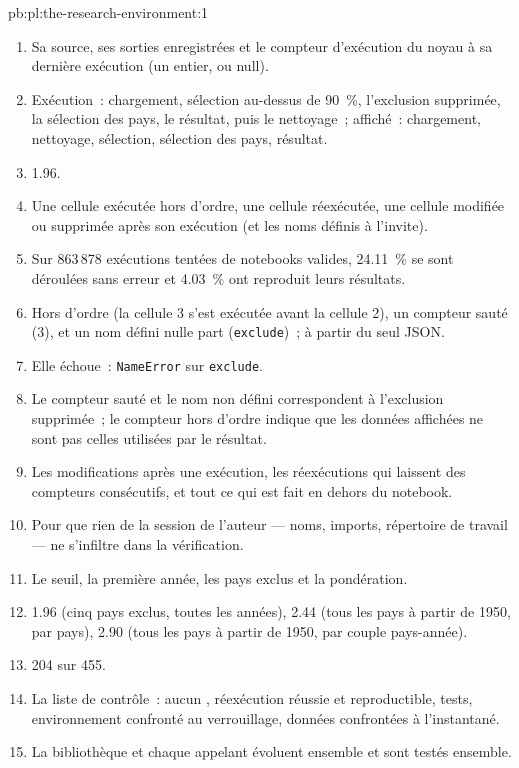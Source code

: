 \begin{solution}{pb:pl:the-research-environment:1}
\begin{enumerate}
\item Sa source, ses sorties enregistrées et le compteur d'exécution du noyau à sa dernière exécution (un entier, ou null).
\item Exécution~: chargement, sélection au-dessus de 90~\%, l'exclusion supprimée, la sélection des pays, le résultat, puis le nettoyage~; affiché~: chargement, nettoyage,
sélection, sélection des pays, résultat.
\item 1.96.
\item Une cellule exécutée hors d'ordre, une cellule réexécutée, une cellule modifiée ou supprimée après son exécution (et les noms définis à l'invite).
\item Sur 863\,878 exécutions tentées de notebooks valides, 24.11~\% se sont déroulées sans erreur et 4.03~\% ont reproduit leurs résultats.
\item Hors d'ordre (la cellule 3 s'est exécutée avant la cellule 2), un compteur sauté (3), et un nom défini nulle part (\texttt{exclude})~; à partir du seul JSON.
\item Elle échoue~: \texttt{NameError} sur \texttt{exclude}.
\item Le compteur sauté et le nom non défini correspondent à l'exclusion supprimée~; le compteur hors d'ordre indique que les données affichées ne sont pas celles utilisées par le
résultat.
\item Les modifications après une exécution, les réexécutions qui laissent des compteurs consécutifs, et tout ce qui est fait en dehors du notebook.
\item Pour que rien de la session de l'auteur --- noms, imports, répertoire de travail --- ne s'infiltre dans la vérification.
\item Le seuil, la première année, les pays exclus et la pondération.
\item 1.96 (cinq pays exclus, toutes les années), 2.44 (tous les pays à partir de 1950, par pays), 2.90 (tous les pays à partir de 1950, par couple pays-année).
\item 204 sur 455.
\item La liste de contrôle~: aucun , réexécution réussie et reproductible, tests, environnement confronté au verrouillage, données confrontées à l'instantané.
\item La bibliothèque et chaque appelant évoluent ensemble et sont testés ensemble.

\end{enumerate}
\end{solution}
